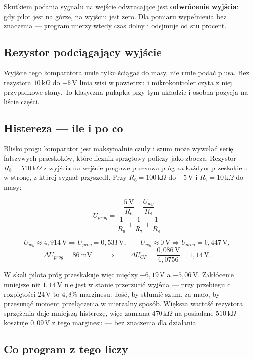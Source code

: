 \documentclass[a4paper,11pt]{article}
\newcommand{\kohm}{\,\mathrm{k}\Omega}
\newcommand{\volt}{\,\mathrm{V}}
\begin{document}
Skutkiem podania sygnału na wejście odwracające jest \textbf{odwrócenie wyjścia}:
gdy pilot jest na górze, na wyjściu jest zero. Dla pomiaru wypełnienia bez
znaczenia --- program mierzy wtedy czas dolny i odejmuje od stu procent.

\subsection{Rezystor podciągający wyjście}

Wyjście tego komparatora umie tylko ściągać do masy, nie umie podać plusa. Bez
rezystora $10\kohm$ do $+5\volt$ linia wisi w powietrzu i mikrokontroler czyta z niej
przypadkowe stany. To klasyczna pułapka przy tym układzie i osobna pozycja na
liście części.

\subsection{Histereza --- ile i po co}

Blisko progu komparator jest maksymalnie czuły i szum może wywołać serię fałszywych
przeskoków, które licznik sprzętowy policzy jako zbocza. Rezystor
$R_8=510\kohm$ z wyjścia na wejście progowe przesuwa próg za każdym przeskokiem
w stronę, z której sygnał przyszedł. Przy $R_6=100\kohm$ do $+5\volt$
i $R_7=10\kohm$ do masy:

\begin{equation}
U_{prog}=\frac{\dfrac{5\volt}{R_6}+\dfrac{U_{wy}}{R_8}}
              {\dfrac{1}{R_6}+\dfrac{1}{R_7}+\dfrac{1}{R_8}}
\label{eq:histereza}
\end{equation}

\[
U_{wy}\approx 4{,}914\volt \Rightarrow U_{prog}=0{,}533\volt,
\qquad
U_{wy}\approx 0\volt \Rightarrow U_{prog}=0{,}447\volt,
\]
\[
\Delta U_{prog}=86\ \mathrm{mV}
\qquad\Longrightarrow\qquad
\Delta U_{CP}=\frac{0{,}086\volt}{0{,}0756}=1{,}14\volt .
\]

W skali pilota próg przeskakuje więc między $-6{,}19\volt$ a $-5{,}06\volt$.
Zakłócenie mniejsze niż $1{,}14\volt$ nie jest w stanie przerzucić wyjścia --- przy
przebiegu o rozpiętości $24\volt$ to $4{,}8\%$ marginesu: dość, by stłumić szum,
za mało, by przesunąć moment przełączenia w mierzalny sposób. Większa wartość
rezystora sprzężenia daje mniejszą histerezę, więc zamiana $470\kohm$ na
posiadane $510\kohm$ kosztuje $0{,}09\volt$ z tego marginesu --- bez znaczenia
dla działania.

\subsection{Co program z tego liczy}
\end{document}
